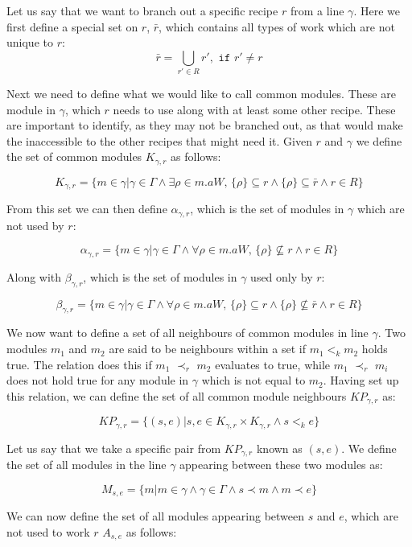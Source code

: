 Let us say that we want to branch out a specific recipe $r$ from a line $\gamma$. Here we first define a special set on $r$, $\bar{r}$, which contains all types of work which are not unique to $r$:
\[\bar{r} = \bigcup_{r' \in R}r', \texttt{ if } r' \neq r\]

Next we need to define what we would like to call common modules. These are module in $\gamma$, which $r$ needs to use along with at least some other recipe. These are important to identify, as they may not be branched out, as that would make the inaccessible to the other recipes that might need it.  Given $r$ and $\gamma$ we define the set of common modules $K_{\gamma ,r}$ as follows:

\[K_{\gamma ,r} = \{m \in \gamma | \gamma \in \Gamma \land \exists \rho \in m.aW,\, \{\rho\} \subseteq r \land \{\rho\} \subseteq \bar{r} \land r \in R\}\]

From this set we can then define $\alpha_{\gamma ,r}$, which is the set of modules in $\gamma$ which are not used by $r$: 

\[\alpha_{\gamma ,r}  = \{m \in \gamma | \gamma \in \Gamma \land \forall \rho \in m.aW,\, \{\rho\} \nsubseteq r \land r \in R\}\]

Along with $\beta_{\gamma ,r}$, which is the set of modules in $\gamma$ used only by $r$:

\[\beta_{\gamma ,r}  = \{m \in \gamma | \gamma \in \Gamma \land \forall \rho \in m.aW,\, \{\rho\} \subseteq r \land \{\rho\} \nsubseteq \bar{r} \land r \in R\}\]

We now want to define a set of all neighbours of common modules in line $\gamma$. Two modules $m_1$ and $m_2$ are said to be neighbours within a set if $m_1 <_k m_2$ holds true. The relation does this if $m_1$ $\prec_r$ $m_2$ evaluates to true, while $m_1$ $\prec_r$ $m_i$ does not hold true for any module in $\gamma$ which is not equal to $m_2$. Having set up this relation, we can define the set of all common module neighbours $KP_{\gamma ,r}$ as:
 
\[KP_{\gamma ,r} = \{(s, e)| {s, e} \in K_{\gamma ,r} \times K_{\gamma ,r} \land s <_k  e\}\]


Let us say that we take a specific pair from $KP_{\gamma ,r}$  known as $(s,e)$. We define the set of all modules in the line $\gamma$ appearing between these two modules as: 

\[M_{s,e} = \{m | m \in \gamma \land \gamma \in \Gamma \land s \prec m \land m \prec e\}\]

We can now define the set of all modules appearing between $s$ and $e$, which are not used to work $r$ $A_{s,e}$ as follows: 

